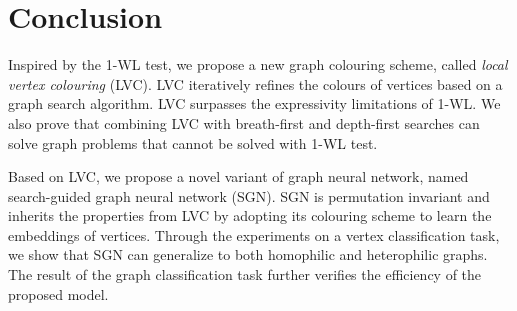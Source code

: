 \section{Conclusion}


Inspired by the 1-WL test, we propose a new graph colouring scheme, called \emph{local vertex colouring} (LVC). LVC iteratively refines the colours of vertices based on a graph search algorithm. LVC surpasses the expressivity limitations of 1-WL. We also prove that combining LVC with breath-first and depth-first searches can solve graph problems that cannot be solved with 1-WL test. 

Based on LVC, we propose a novel variant of graph neural network, named search-guided graph neural network (SGN). SGN is permutation invariant and
inherits the properties from LVC by adopting its colouring scheme to learn the embeddings of vertices. 
Through the experiments on a vertex classification task, we show that SGN can generalize to both homophilic and heterophilic graphs. The result of the graph classification task further verifies the efficiency of the proposed model.